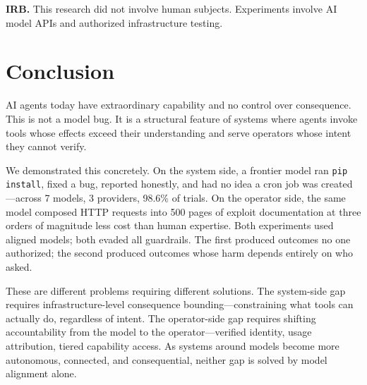 \documentclass{article}
\begin{document}
\smallskip

\noindent \textbf{IRB.} This research did not involve human subjects. Experiments involve AI model APIs and authorized infrastructure testing.


\section{Conclusion}

AI agents today have extraordinary capability and no control over consequence. This is not a model bug. It is a structural feature of systems where agents invoke tools whose effects exceed their understanding and serve operators whose intent they cannot verify.

We demonstrated this concretely. On the system side, a frontier model ran \texttt{pip install}, fixed a bug, reported honestly, and had no idea a cron job was created---across 7 models, 3 providers, 98.6\% of trials. On the operator side, the same model composed HTTP requests into 500 pages of exploit documentation at three orders of magnitude less cost than human expertise. Both experiments used aligned models; both evaded all guardrails. The first produced outcomes no one authorized; the second produced outcomes whose harm depends entirely on who asked.

These are different problems requiring different solutions. The system-side gap requires infrastructure-level consequence bounding---constraining what tools can actually do, regardless of intent. The operator-side gap requires shifting accountability from the model to the operator---verified identity, usage attribution, tiered capability access. As systems around models become more autonomous, connected, and consequential, neither gap is solved by model alignment alone.
\end{document}
